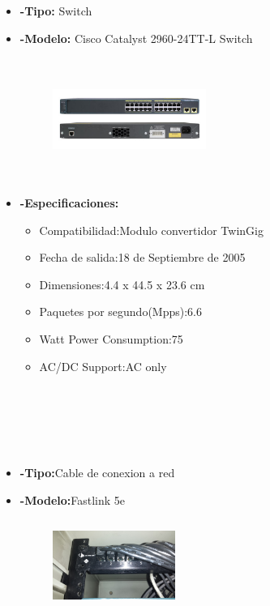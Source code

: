 \documentclass{udpreport}
\begin{document}
\begin{itemize}
\begin{itemize}
		\end{itemize}
		\item{\bf-Tipo:} Switch\\
		\item{\bf-Modelo:} Cisco Catalyst 2960-24TT-L Switch\\
		\begin{figure}[h]
    		\centering
    	\includegraphics[width=5cm, height=4cm]{switch.jpg}
		\end{figure}
		\item{\bf-Especificaciones:}
		\begin{itemize}
			\item Compatibilidad:Modulo convertidor TwinGig\\
			\item Fecha de salida:18 de Septiembre de 2005\\
			\item Dimensiones:4.4 x 44.5 x 23.6 cm\\
			\item Paquetes por segundo(Mpps):6.6\\
			\item Watt Power Consumption:75\\
			\item AC/DC Support:AC only\\ \\ \\ \\ \\ \\
		\end{itemize}
		\item{\bf-Tipo:}Cable de conexion a red\\
		\item{\bf-Modelo:}Fastlink 5e\\
		\begin{figure}[h]
    		\centering
    	\includegraphics[width=4cm, height=3cm]{cablecat5e.jpg}

\end{figure}
\end{itemize}
\end{document}
